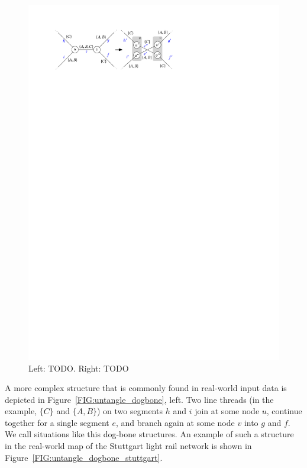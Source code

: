 \documentclass[format=acmsmall, review=false, screen=true]{acmart}
\begin{document}
\begin{figure}
\centering
  \includegraphics[width=.7\textwidth, page=2]{untangling/dogbone.pdf}
  \caption{Left: TODO. Right: TODO}  
  \label{FIG:untangle_dogbone2}
\end{figure}

A more complex structure that is commonly found in real-world input data is depicted in Figure~\ref{FIG:untangle_dogbone}, left.
Two line threads (in the example, $\{C\}$ and $\{A, B\}$) on two segments $h$ and $i$ join at some node $u$, continue together for a single segment $e$, and branch again at some node $v$ into $g$ and $f$. We call situations like this dog-bone structures.
An example of such a structure in the real-world map of the Stuttgart light rail network is shown in Figure~\ref{FIG:untangle_dogbone_stuttgart}.
\end{document}

